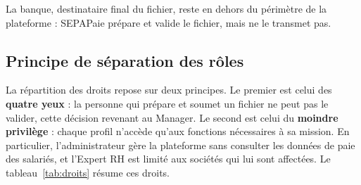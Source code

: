 La banque, destinataire final du fichier, reste en dehors du périmètre de la plateforme : SEPAPaie prépare et valide le fichier, mais ne le transmet pas.

\subsection{Principe de séparation des rôles}

La répartition des droits repose sur deux principes. Le premier est celui des \textbf{quatre yeux} : la personne qui prépare et soumet un fichier ne peut pas le valider, cette décision revenant au Manager. Le second est celui du \textbf{moindre privilège} : chaque profil n'accède qu'aux fonctions nécessaires à sa mission. En particulier, l'administrateur gère la plateforme sans consulter les données de paie des salariés, et l'Expert RH est limité aux sociétés qui lui sont affectées. Le tableau~\ref{tab:droits} résume ces droits.

